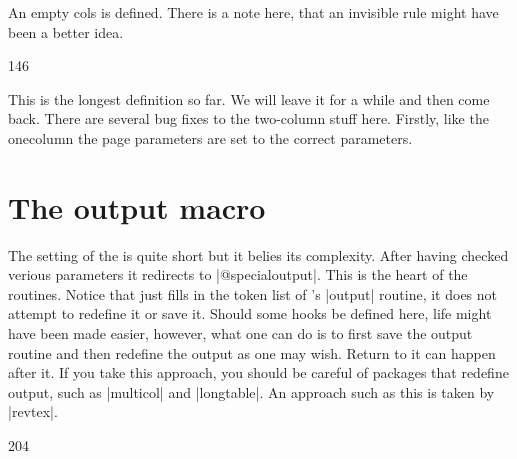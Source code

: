 \begin{multicols}{2}
An empty cols is defined. There is a note here, that an invisible rule might have been a better idea.

\begin{Code}
146 \def \@emptycol {\vbox{}\penalty -\@M}
\end{Code}

 This is the longest definition so far. We will leave it for a while and then come back. There are several bug fixes to the two-column stuff here. Firstly, like the onecolumn the page parameters are set to the correct parameters.


\begin{Code}
147 \def \twocolumn {%
148 \clearpage
149 \global\columnwidth\textwidth
150 \global\advance\columnwidth-\columnsep
151 \global\divide\columnwidth\tw@
152 \global\hsize\columnwidth
153 \global\linewidth\columnwidth
154 \global\@twocolumntrue
155 \global\@firstcolumntrue
156 \col@number \tw@
\end{Code}
\end{multicols}



\section*{The output macro}
The setting of the  is quite short but it belies its complexity.
After having checked verious parameters it redirects to |@specialoutput|. This is the heart of the routines. Notice that \latex just fills in the token list of \tex's |output| routine, it does not attempt to redefine it or save it. 
Should some hooks be defined here, life might have been made easier, however, what one can do is to first save the \latex output routine and then redefine the output as one may wish. Return to it can happen after it. If you take this approach, you should be careful of packages that redefine output, such as |multicol| and |longtable|. An approach such as this is taken by |revtex|.

\begin{teXXX}
204 
\end{teXXX}


